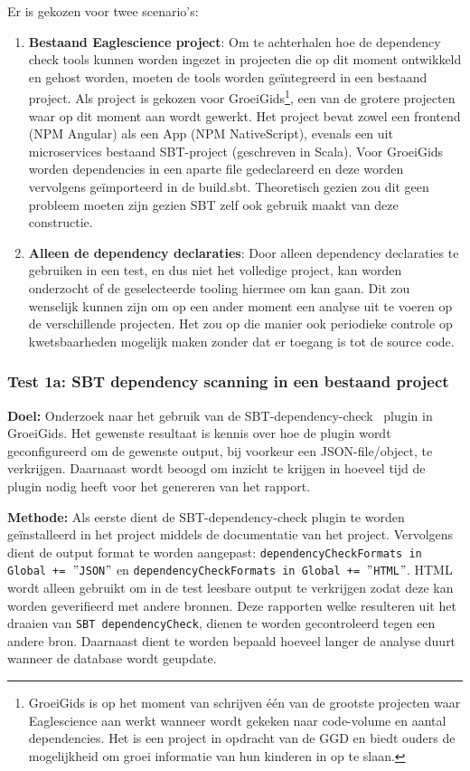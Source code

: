Er is gekozen voor twee scenario's:
\begin{enumerate}
    \item \textbf{Bestaand Eaglescience project}: Om te achterhalen hoe de dependency check tools kunnen worden ingezet in projecten die op dit moment ontwikkeld en gehost worden, moeten de tools worden geïntegreerd in een bestaand project. Als project is gekozen voor GroeiGids\footnote{GroeiGids is op het moment van schrijven één van de grootste projecten waar Eaglescience aan werkt wanneer wordt gekeken naar code-volume en aantal dependencies. Het is een project in opdracht van de GGD en biedt ouders de mogelijkheid om groei informatie van hun kinderen in op te slaan.}, een van de grotere projecten waar op dit moment aan wordt gewerkt. Het project bevat zowel een frontend (NPM Angular) als een App (NPM NativeScript), evenals een uit microservices bestaand SBT-project (geschreven in Scala). Voor GroeiGids worden dependencies in een aparte file gedeclareerd en deze worden vervolgens geïmporteerd in de build.sbt. Theoretisch gezien zou dit geen probleem moeten zijn gezien SBT zelf ook gebruik maakt van deze constructie.

    \item \textbf{Alleen de dependency declaraties}: Door alleen dependency declaraties te gebruiken in een test, en dus niet het volledige project, kan worden onderzocht of de geselecteerde tooling hiermee om kan gaan. Dit zou wenselijk kunnen zijn om op een ander moment een analyse uit te voeren op de verschillende projecten. Het zou op die manier ook periodieke controle op kwetsbaarheden mogelijk maken zonder dat er toegang is tot de source code.
\end{enumerate}

\subsubsection{Test 1a: SBT dependency scanning in een bestaand project}
\textbf{Doel:} Onderzoek naar het gebruik van de SBT-dependency-check~\citep{Albuch:z.d.} plugin in GroeiGids. Het gewenste resultaat is kennis over hoe de plugin wordt geconfigureerd om de gewenste output, bij voorkeur een JSON-file/object, te verkrijgen. Daarnaast wordt beoogd om inzicht te krijgen in hoeveel tijd de plugin nodig heeft voor het genereren van het rapport.

\textbf{Methode:} Als eerste dient de SBT-dependency-check plugin te worden geïnstalleerd in het project middels de documentatie van het project. Vervolgens dient de output format te worden aangepast: \texttt{dependencyCheckFormats in Global += $"$JSON$"$}
en \texttt{dependencyCheckFormats in Global += $"$HTML$"$}. HTML wordt alleen gebruikt om in de test leesbare output te verkrijgen zodat deze kan worden geverifieerd met andere bronnen. Deze rapporten welke resulteren uit het draaien van \texttt{SBT dependencyCheck}, dienen te worden gecontroleerd tegen een andere bron. Daarnaast dient te worden bepaald hoeveel langer de analyse duurt wanneer de database wordt geupdate.

